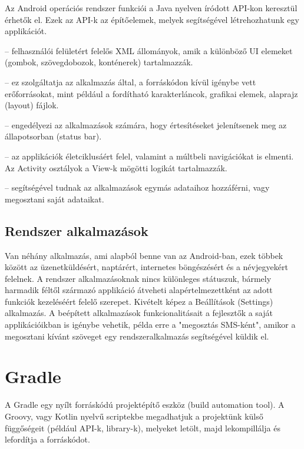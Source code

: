 Az Android operációs rendszer funkciói a Java nyelven íródott API-kon keresztül érhetők el. Ezek az API-k az építőelemek, melyek segítségével létrehozhatunk egy applikációt.

\begin{description}
	\setlength{\itemsep}{0.04mm}
	\item[View rendszer] -- felhasználói felületért felelős XML állományok, amik a különböző UI elemeket (gombok, szövegdobozok, konténerek) tartalmazzák.
	\item[Erőforráskezelő (Resource Manager)] -- ez szolgáltatja az alkalmazás által, a forráskódon kívül igénybe vett erőforrásokat, mint például a fordítható karakterláncok, grafikai elemek, alaprajz (layout) fájlok.
	\item[Értesítéskezelő (Notification Manager)] -- engedélyezi az alkalmazások számára, hogy értesítéseket jelenítsenek meg az állapotsorban (status bar).
	\item[Activity-kezelő] -- az applikációk életciklusáért felel, valamint a múltbeli navigációkat is elmenti. Az Activity osztályok a View-k mögötti logikát tartalmazzák.
	\item[Tartalom szolgáltató (Content Provider)] -- segítségével tudnak az alkalmazások egymás adataihoz hozzáférni, vagy megosztani saját adataikat.
\end{description}

\subsection{Rendszer alkalmazások}

Van néhány alkalmazás, ami alapból benne van az Android-ban, ezek többek között az üzenetküldésért, naptárért, internetes böngészésért és a névjegyekért felelnek. A rendszer alkalmazásoknak nincs különleges státuszuk, bármely harmadik féltől származó applikáció átveheti alapértelmezettként az adott funkciók kezeléséért felelő szerepet. Kivételt képez a Beállítások (Settings) alkalmazás. A beépített alkalmazások funkcionalitásait a fejlesztők a saját applikációikban is igénybe vehetik, példa erre a "megosztás SMS-ként", amikor a megosztani kívánt szöveget egy rendszeralkalmazás segítségével küldik el.


\section{Gradle}

A Gradle\cite{gradle} egy nyílt forráskódú projektépítő eszköz (build automation tool). A Groovy, vagy Kotlin nyelvű scriptekbe megadhatjuk a projektünk külső függőségeit (például API-k, library-k), melyeket letölt, majd lekompillálja és lefordítja a forráskódot.

